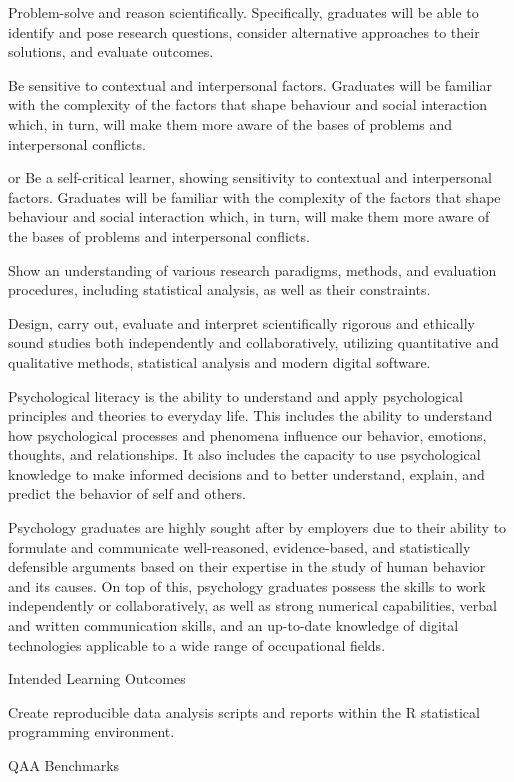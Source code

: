 \documentclass[
  11pt,
  letterpaper,
  oneside,
  open=any]{scrbook}
\begin{document}
Problem-solve and reason scientifically. Specifically, graduates will be
able to identify and pose research questions, consider alternative
approaches to their solutions, and evaluate outcomes.

Be sensitive to contextual and interpersonal factors. Graduates will be
familiar with the complexity of the factors that shape behaviour and
social interaction which, in turn, will make them more aware of the
bases of problems and interpersonal conflicts.

or Be a self-critical learner, showing sensitivity to contextual and
interpersonal factors. Graduates will be familiar with the complexity of
the factors that shape behaviour and social interaction which, in turn,
will make them more aware of the bases of problems and interpersonal
conflicts.

Show an understanding of various research paradigms, methods, and
evaluation procedures, including statistical analysis, as well as their
constraints.

Design, carry out, evaluate and interpret scientifically rigorous and
ethically sound studies both independently and collaboratively,
utilizing quantitative and qualitative methods, statistical analysis and
modern digital software.

Psychological literacy is the ability to understand and apply
psychological principles and theories to everyday life. This includes
the ability to understand how psychological processes and phenomena
influence our behavior, emotions, thoughts, and relationships. It also
includes the capacity to use psychological knowledge to make informed
decisions and to better understand, explain, and predict the behavior of
self and others.

Psychology graduates are highly sought after by employers due to their
ability to formulate and communicate well-reasoned, evidence-based, and
statistically defensible arguments based on their expertise in the study
of human behavior and its causes. On top of this, psychology graduates
possess the skills to work independently or collaboratively, as well as
strong numerical capabilities, verbal and written communication skills,
and an up-to-date knowledge of digital technologies applicable to a wide
range of occupational fields.

Intended Learning Outcomes

Create reproducible data analysis scripts and reports within the R
statistical programming environment.

QAA Benchmarks
\end{document}
